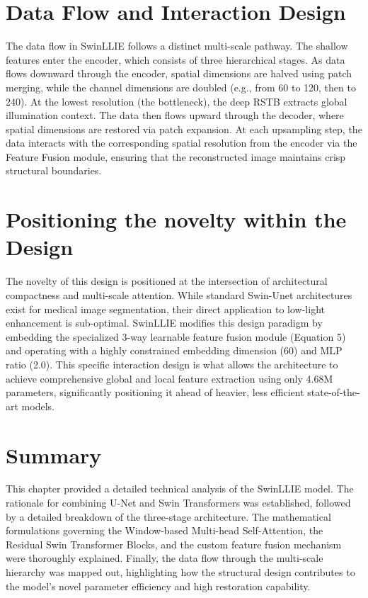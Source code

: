 \documentclass[12pt, a4paper]{report}
\begin{document}
\section{Data Flow and Interaction Design}
The data flow in SwinLLIE follows a distinct multi-scale pathway. The shallow features enter the encoder, which consists of three hierarchical stages. As data flows downward through the encoder, spatial dimensions are halved using patch merging, while the channel dimensions are doubled (e.g., from 60 to 120, then to 240). At the lowest resolution (the bottleneck), the deep RSTB extracts global illumination context. The data then flows upward through the decoder, where spatial dimensions are restored via patch expansion. At each upsampling step, the data interacts with the corresponding spatial resolution from the encoder via the Feature Fusion module, ensuring that the reconstructed image maintains crisp structural boundaries.

\section{Positioning the novelty within the Design}
The novelty of this design is positioned at the intersection of architectural compactness and multi-scale attention. While standard Swin-Unet architectures exist for medical image segmentation, their direct application to low-light enhancement is sub-optimal. SwinLLIE modifies this design paradigm by embedding the specialized 3-way learnable feature fusion module (Equation 5) and operating with a highly constrained embedding dimension (60) and MLP ratio (2.0). This specific interaction design is what allows the architecture to achieve comprehensive global and local feature extraction using only 4.68M parameters, significantly positioning it ahead of heavier, less efficient state-of-the-art models.

\section{Summary}
This chapter provided a detailed technical analysis of the SwinLLIE model. The rationale for combining U-Net and Swin Transformers was established, followed by a detailed breakdown of the three-stage architecture. The mathematical formulations governing the Window-based Multi-head Self-Attention, the Residual Swin Transformer Blocks, and the custom feature fusion mechanism were thoroughly explained. Finally, the data flow through the multi-scale hierarchy was mapped out, highlighting how the structural design contributes to the model's novel parameter efficiency and high restoration capability.
\end{document}
